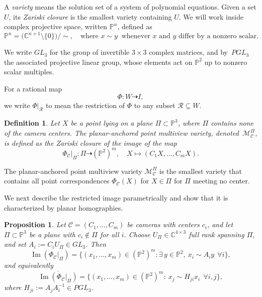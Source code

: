 \documentclass{article}
\newtheorem{proposition}{Proposition}
\newtheorem{definition}{Definition}
\newcommand{\PP}{\mathbb{P}}
\begin{document}
A \emph{variety} means the solution set of a system of polynomial equations. 
Given a set $U$, its \emph{Zariski closure} is the smallest variety containing $U$.  
We will work inside complex projective space, written $\mathbb{P}^n$, defined as
\[
\mathbb{P}^n = \big(\mathbb{C}^{n+1} \setminus \{0\}\big) / \sim,
\quad \text{where } x \sim y \;\; \text{whenever } x \text{ and } y 
\text{ differ by a nonzero scalar.}
\]

We write \( GL_3 \) for the group of invertible \( 3\times 3 \) complex matrices, and by~\( PGL_3\) the associated projective linear group, whose elements act on \( \mathbb{P}^2 \) up to nonzero scalar multiples.

For a rational map
\[
\Phi : W \dashrightarrow I,
\]
we write $\Phi|_\mathcal{R}$ to mean the restriction of $\Phi$ to any subset $\mathcal{R} \subseteq W$.

\begin{definition} \label{def:planar_anchored_variety} 
Let $X$ be a point lying on a plane $\Pi \subset \mathbb{P}^3$, 
where $\Pi$ contains none of the camera centers. \textit{The planar-anchored point multiview variety}, denoted~$\mathcal{M}_\mathcal{C}^\Pi$, 
is defined as the Zariski closure of the image of the map
\[
\Phi_\mathcal{C}|_\Pi : \Pi \dashrightarrow (\mathbb{P}^2)^m, 
\quad 
X \longmapsto (C_1 X, \ldots, C_m X).
\]
\end{definition} 

The planar-anchored point multiview variety $\mathcal{M}_\mathcal{C}^\Pi$ is the smallest variety that contains all point correspondences $\Phi_\mathcal{C}(X)$ for $X \in \Pi$ for $\Pi$ meeting no center.

\medskip

We next describe the restricted image parametrically and show that it is characterized by planar homographies.
\begin{proposition} \label{prop:homographies}
Let $\mathcal{C}=(C_1,\dots,C_m)$ be cameras with centers $c_i$, and let~$\Pi\subset\PP^3$ 
be a plane with $c_i\notin\Pi$ for all $i$.
Choose $U_\Pi\in \mathbb C^{4\times3}$ full rank spanning $\Pi$, and set $A_i:=C_iU_\Pi\in GL_3$.
Then
\[
\operatorname{Im}(\Phi_\mathcal{C}|_\Pi)
=\{(x_1,\dots,x_m)\in(\PP^2)^m:\exists\,y\in\PP^2,\ x_i\sim A_i y\ \ \forall i\},
\]
and equivalently
\[
\overline{\operatorname{Im}(\Phi_\mathcal{C}|_\Pi)}
=\{(x_1,\dots,x_m)\in(\PP^2)^m:\ x_j\sim H_{ji}x_i\ \ \forall i,j\},
\]
where $H_{j i}:=A_jA_i^{-1}\in PGL_3$.
\end{proposition}
\end{document}
